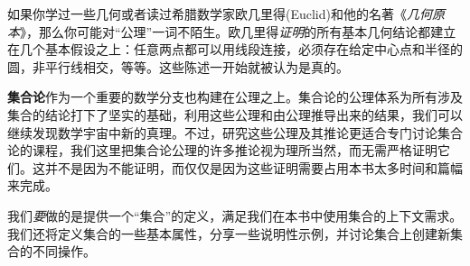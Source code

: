 如果你学过一些几何或者读过希腊数学家欧几里得(Euclid)和他的名著《\emph{几何原本}》，那么你可能对``公理''一词不陌生。欧几里得\emph{证明}的所有基本几何结论都建立在几个基本假设之上：任意两点都可以用线段连接，必须存在给定中心点和半径的圆，非平行线相交，等等。这些陈述一开始就被认为是真的。

\textbf{集合论}作为一个重要的数学分支也构建在公理之上。集合论的公理体系为所有涉及集合的结论打下了坚实的基础，利用这些公理和由公理推导出来的结果，我们可以继续发现数学宇宙中新的真理。不过，研究这些公理及其推论更适合专门讨论集合论的课程，我们这里把集合论公理的许多推论视为理所当然，而无需严格证明它们。这并不是因为不能证明，而仅仅是因为这些证明需要占用本书太多时间和篇幅来完成。

我们\emph{要}做的是提供一个``集合''的定义，满足我们在本书中使用集合的上下文需求。我们还将定义集合的一些基本属性，分享一些说明性示例，并讨论集合上创建新集合的不同操作。

